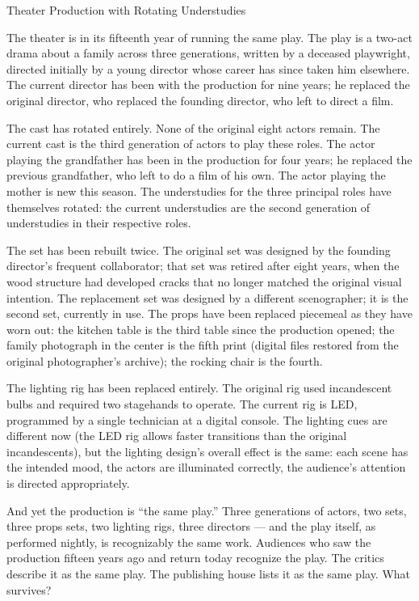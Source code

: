 \begin{coda}{Theater Production with Rotating Understudies}

The theater is in its fifteenth year of running the same play. The
play is a two-act drama about a family across three generations,
written by a deceased playwright, directed initially by a young
director whose career has since taken him elsewhere. The current
director has been with the production for nine years; he replaced
the original director, who replaced the founding director, who
left to direct a film.

The cast has rotated entirely. None of the original eight actors
remain. The current cast is the third generation of actors to play
these roles. The actor playing the grandfather has been in the
production for four years; he replaced the previous grandfather,
who left to do a film of his own. The actor playing the mother is
new this season. The understudies for the three principal roles
have themselves rotated: the current understudies are the second
generation of understudies in their respective roles.

The set has been rebuilt twice. The original set was designed by
the founding director's frequent collaborator; that set was retired
after eight years, when the wood structure had developed cracks
that no longer matched the original visual intention. The
replacement set was designed by a different scenographer; it is
the second set, currently in use. The props have been replaced
piecemeal as they have worn out: the kitchen table is the third
table since the production opened; the family photograph in the
center is the fifth print (digital files restored from the
original photographer's archive); the rocking chair is the fourth.

The lighting rig has been replaced entirely. The original rig used
incandescent bulbs and required two stagehands to operate. The
current rig is LED, programmed by a single technician at a digital
console. The lighting cues are different now (the LED rig allows
faster transitions than the original incandescents), but the
lighting design's overall effect is the same: each scene has the
intended mood, the actors are illuminated correctly, the audience's
attention is directed appropriately.

And yet the production is ``the same play.'' Three generations of
actors, two sets, three props sets, two lighting rigs, three
directors --- and the play itself, as performed nightly, is
recognizably the same work. Audiences who saw the production fifteen
years ago and return today recognize the play. The critics
describe it as the same play. The publishing house lists it as
the same play. What survives?


\end{coda}
